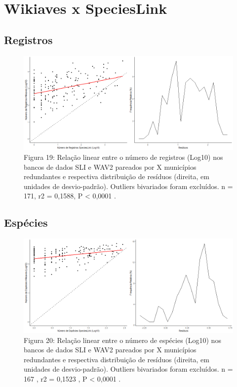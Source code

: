 \section{Wikiaves x SpeciesLink}

\texto

\subsection{Registros}

\begin{figure}[h!]
\centering
\includegraphics[width = 12cm]{Imagens/4113.png}
\\{\scriptsize  Figura 19: Relação linear entre o número de registros (Log10) nos bancos de dados SLI e WAV2 pareados por X municípios redundantes e respectiva distribuição de resíduos (direita, em unidades de desvio-padrão). Outliers bivariados foram excluídos. n = 171, r2 = 0,1588, P < 0,0001 .}
\end{figure}

\texto

\subsection{Espécies}

\begin{figure}[h!]
\centering
\includegraphics[width = 12cm]{Imagens/4213.png}
\\{\scriptsize Figura 20: Relação linear entre o número de espécies (Log10) nos bancos de dados SLI e WAV2 pareados por X municípios redundantes e respectiva distribuição de resíduos (direita, em unidades de desvio-padrão). Outliers bivariados foram excluídos. n = 167 , r2 = 0,1523 , P < 0,0001 .}
\end{figure}

